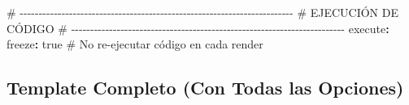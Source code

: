 \documentclass[
  doc,
  floatsintext,
  longtable,
  a4paper,
  nolmodern,
  notxfonts,
  notimes,
  12pt,
  colorlinks=true,linkcolor=blue,citecolor=blue,urlcolor=blue]{apa7}
\newenvironment{Shaded}{\begin{snugshade}}{\end{snugshade}}
\newcommand{\AttributeTok}[1]{\textcolor[rgb]{0.40,0.45,0.13}{#1}}
\newcommand{\CharTok}[1]{\textcolor[rgb]{0.13,0.47,0.30}{#1}}
\newcommand{\CommentTok}[1]{\textcolor[rgb]{0.37,0.37,0.37}{#1}}
\newcommand{\FunctionTok}[1]{\textcolor[rgb]{0.28,0.35,0.67}{#1}}
\newcommand{\KeywordTok}[1]{\textcolor[rgb]{0.00,0.23,0.31}{\textbf{#1}}}
\begin{document}
\begin{Shaded}
\begin{Highlighting}[]
\CommentTok{\# {-}{-}{-}{-}{-}{-}{-}{-}{-}{-}{-}{-}{-}{-}{-}{-}{-}{-}{-}{-}{-}{-}{-}{-}{-}{-}{-}{-}{-}{-}{-}{-}{-}{-}{-}{-}{-}{-}{-}{-}{-}{-}{-}{-}{-}{-}{-}{-}{-}{-}{-}{-}{-}{-}{-}{-}{-}{-}{-}{-}{-}{-}{-}{-}{-}{-}{-}{-}{-}{-}{-}{-}}
\CommentTok{\# EJECUCIÓN DE CÓDIGO}
\CommentTok{\# {-}{-}{-}{-}{-}{-}{-}{-}{-}{-}{-}{-}{-}{-}{-}{-}{-}{-}{-}{-}{-}{-}{-}{-}{-}{-}{-}{-}{-}{-}{-}{-}{-}{-}{-}{-}{-}{-}{-}{-}{-}{-}{-}{-}{-}{-}{-}{-}{-}{-}{-}{-}{-}{-}{-}{-}{-}{-}{-}{-}{-}{-}{-}{-}{-}{-}{-}{-}{-}{-}{-}{-}}
\FunctionTok{execute}\KeywordTok{:}
\AttributeTok{  }\FunctionTok{freeze}\KeywordTok{:}\AttributeTok{ }\CharTok{true}\CommentTok{       \# No re{-}ejecutar código en cada render}
\end{Highlighting}
\end{Shaded}

\subsection{Template Completo (Con Todas las
Opciones)}\label{template-completo-con-todas-las-opciones}
\end{document}
